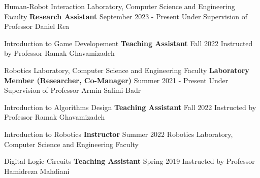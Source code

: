 \begin{cventries}

    
    \cventry
    {Human-Robot Interaction Laboratory, Computer Science and Engineering Faculty}
    {\bullet \space \textbf {Research Assistant}}
    {}
    {September 2023 - Present}
    {Under Supervision of Professor Daniel Rea}
    \vspace{0.4 cm}

    \cventry
    {Introduction to Game Developement
    }
    {\bullet \space \textbf {Teaching Assistant}}
    {}
    {Fall 2022}
    {Instructed by Professor Ramak Ghavamizadeh}
    \vspace{0.4 cm}

    \cventry
    {Robotics Laboratory, Computer Science and Engineering Faculty}
    {\bullet \space \textbf {Laboratory Member (Researcher, Co-Manager)}}
    {}
    {Summer 2021 - Present}
    {Under Supervision of Professor Armin Salimi-Badr}
    \vspace{0.4 cm}

    \cventry
    {Introduction to Algorithms Design}
    {\bullet \space \textbf {Teaching Assistant}}
    {}
    {Fall 2022}
    {Instructed by Professor Ramak Ghavamizadeh}
    \vspace{0.4 cm}
    
    \cventry
    {Introduction to Robotics}
    {\bullet \space \textbf {Instructor}}
    {}
    {Summer 2022}
    {Robotics Laboratory, Computer Science and Engineering Faculty}
    \vspace{0.4 cm}
    
    \cventry
    {Digital Logic Circuits}
    {\bullet \space \textbf {Teaching Assistant}}
    {}
    {Spring 2019}
    {Instructed by Professor Hamidreza Mahdiani}
    
\end{cventries}